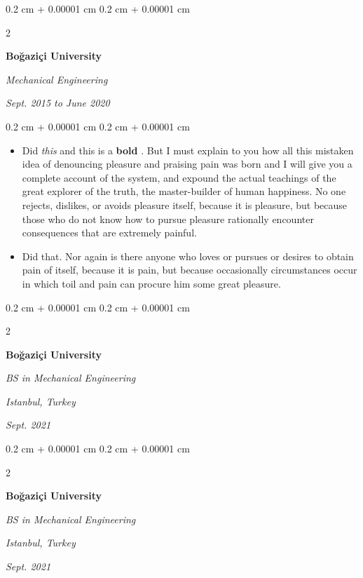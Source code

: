 \documentclass[10pt, letterpaper]{article}
\newenvironment{highlights}{
    \begin{itemize}[
        topsep=0.10 cm,
        parsep=0.10 cm,
        partopsep=0pt,
        itemsep=0pt,
        leftmargin=0.4 cm + 10pt
    ]
}{
    \end{itemize}
} %
\newenvironment{onecolentry}{
    \begin{adjustwidth}{
        0.2 cm + 0.00001 cm
    }{
        0.2 cm + 0.00001 cm
    }
}{
    \end{adjustwidth}
} %
\newenvironment{twocolentry}[2][]{
    \onecolentry
    \def\secondColumn{#2}
    \setcolumnwidth{\fill, 4.5 cm}
    \begin{paracol}{2}
}{
    \switchcolumn \raggedleft \secondColumn
    \end{paracol}
    \endonecolentry
} %
\let\hrefWithoutArrow\href
\renewcommand{\href}[2]{\hrefWithoutArrow{#1}{\mbox{\ifthenelse{\equal{#2}{}}{ }{#2 }\raisebox{.15ex}{\footnotesize \faExternalLink*}}}}
\begin{document}
        \vspace{0.2 cm-3px}

        \begin{twocolentry}{
            
            
        \textit{Sept. 2015 to June 2020}}
            \textbf{Boğaziçi University}

            \textit{Mechanical Engineering}
        \end{twocolentry}

        \vspace{0.10 cm-3px}
        \begin{onecolentry}
            \begin{highlights}
                \item Did \textit{this} and this is a \textbf{bold} \href{https://example.com}{link}. But I must explain to you how all this mistaken idea of denouncing pleasure and praising pain was born and I will give you a complete account of the system, and expound the actual teachings of the great explorer of the truth, the master-builder of human happiness. No one rejects, dislikes, or avoids pleasure itself, because it is pleasure, but because those who do not know how to pursue pleasure rationally encounter consequences that are extremely painful.
                \item Did that. Nor again is there anyone who loves or pursues or desires to obtain pain of itself, because it is pain, but because occasionally circumstances occur in which toil and pain can procure him some great pleasure.
            \end{highlights}
        \end{onecolentry}


        \vspace{0.2 cm-3px}

        \begin{twocolentry}{
        \textit{Istanbul, Turkey}    
            
        \textit{Sept. 2021}}
            \textbf{Boğaziçi University}

            \textit{BS in Mechanical Engineering}
        \end{twocolentry}



        \vspace{0.2 cm-3px}

        \begin{twocolentry}{
        \textit{Istanbul, Turkey}    
            
        \textit{Sept. 2021}}
            \textbf{Boğaziçi University}

            \textit{BS in Mechanical Engineering}
        \end{twocolentry}
\end{document}
